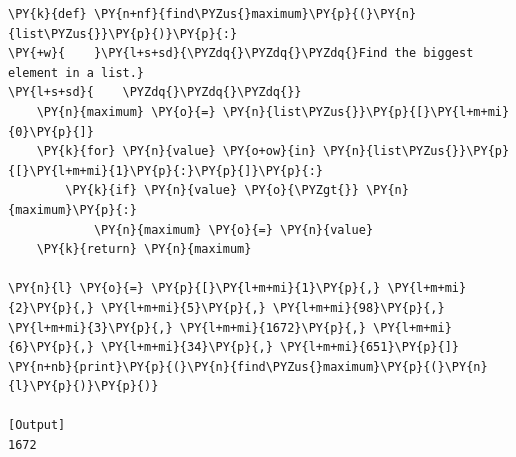 \begin{Verbatim}[label=\makebox{\url{https://github.com/lucabaldini/cmepda/tree/master/slides/latex/snippets/find\_max.py}},commandchars=\\\{\}]
\PY{k}{def} \PY{n+nf}{find\PYZus{}maximum}\PY{p}{(}\PY{n}{list\PYZus{}}\PY{p}{)}\PY{p}{:}
\PY{+w}{    }\PY{l+s+sd}{\PYZdq{}\PYZdq{}\PYZdq{}Find the biggest element in a list.}
\PY{l+s+sd}{    \PYZdq{}\PYZdq{}\PYZdq{}}
    \PY{n}{maximum} \PY{o}{=} \PY{n}{list\PYZus{}}\PY{p}{[}\PY{l+m+mi}{0}\PY{p}{]}
    \PY{k}{for} \PY{n}{value} \PY{o+ow}{in} \PY{n}{list\PYZus{}}\PY{p}{[}\PY{l+m+mi}{1}\PY{p}{:}\PY{p}{]}\PY{p}{:}
        \PY{k}{if} \PY{n}{value} \PY{o}{\PYZgt{}} \PY{n}{maximum}\PY{p}{:}
            \PY{n}{maximum} \PY{o}{=} \PY{n}{value}
    \PY{k}{return} \PY{n}{maximum}

\PY{n}{l} \PY{o}{=} \PY{p}{[}\PY{l+m+mi}{1}\PY{p}{,} \PY{l+m+mi}{2}\PY{p}{,} \PY{l+m+mi}{5}\PY{p}{,} \PY{l+m+mi}{98}\PY{p}{,} \PY{l+m+mi}{3}\PY{p}{,} \PY{l+m+mi}{1672}\PY{p}{,} \PY{l+m+mi}{6}\PY{p}{,} \PY{l+m+mi}{34}\PY{p}{,} \PY{l+m+mi}{651}\PY{p}{]}
\PY{n+nb}{print}\PY{p}{(}\PY{n}{find\PYZus{}maximum}\PY{p}{(}\PY{n}{l}\PY{p}{)}\PY{p}{)}

[Output]
1672
\end{Verbatim}